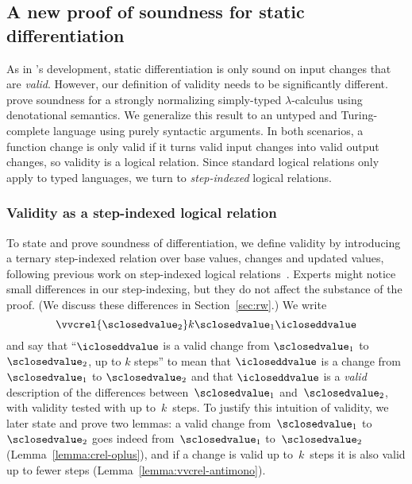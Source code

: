 \subsection{A new proof of soundness for static differentiation}
\label{sec:sound-derive}

As in \citet{CaiEtAl2014ILC}'s development, static differentiation is
only sound on input changes that are \emph{valid}. However, our
definition of validity needs to be significantly different.
%
\citeauthor{CaiEtAl2014ILC} prove soundness for a strongly normalizing
simply-typed $\lambda$-calculus using denotational semantics. We generalize this
result to an untyped and Turing-complete language using purely syntactic
arguments. In both scenarios, a function change is only valid if it turns valid
input changes into valid output changes, so validity is a logical relation.
Since standard logical relations only apply to typed languages, we turn to
\emph{step-indexed} logical relations.

\subsubsection{Validity as a step-indexed logical relation}
To state and prove soundness of differentiation, we define validity by
introducing a ternary step-indexed relation over base values, changes and
updated values, following previous work on step-indexed
logical relations~\citep{Ahmed2006stepindexed,Acar08}. Experts might notice
small differences in our step-indexing, but they do not affect the substance of
the proof. (We discuss these differences in Section~\ref{sec:rw}.)
%
We write
\[\vvcrel {\sclosedvalue_2} k {\sclosedvalue_1} \icloseddvalue\]
\noindent and say that ``$\icloseddvalue$ is a valid change from
$\sclosedvalue_1$ to $\sclosedvalue_2$, up to $k$ steps'' to mean that
$\icloseddvalue$ is a change from $\sclosedvalue_1$ to
$\sclosedvalue_2$ and that $\icloseddvalue$ is a \emph{valid}
description of the differences between~$\sclosedvalue_1$ 
and~$\sclosedvalue_2$, with validity tested with up to~$k$~steps.
%
To justify this intuition of validity, we later state and prove two
lemmas: a valid change from~$\sclosedvalue_1$ to~$\sclosedvalue_2$
goes indeed from~$\sclosedvalue_1$ to~$\sclosedvalue_2$
(Lemma~\ref{lemma:crel-oplus}), and if a change is valid up to~$k$~steps it
is also valid up to fewer steps (Lemma~\ref{lemma:vvcrel-antimono}).

